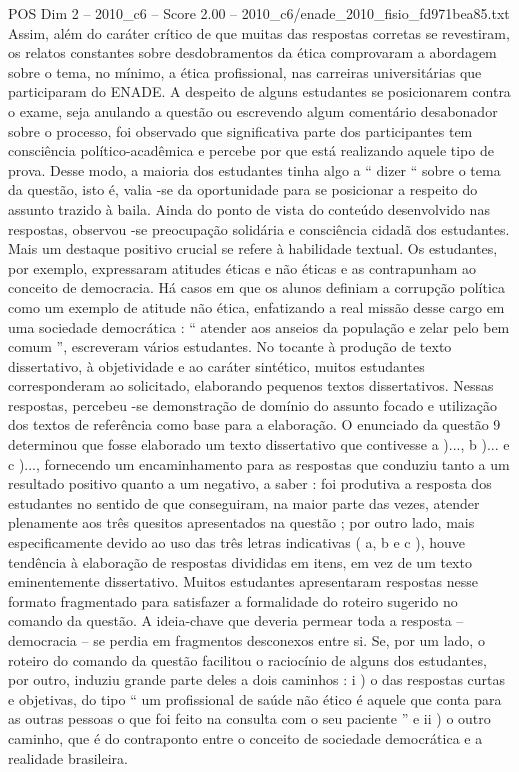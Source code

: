 \begin{textsample}{POS Dim 2 – 2010\_c6 – Score 2.00 – 2010\_c6/enade\_2010\_fisio\_fd971bea85.txt}
Assim, além do caráter crítico de que muitas das respostas corretas se revestiram, os relatos constantes sobre desdobramentos da ética comprovaram a abordagem sobre o tema, no mínimo, a ética profissional, nas carreiras universitárias que participaram do ENADE.
A despeito de alguns estudantes se posicionarem contra o exame, seja anulando a questão ou escrevendo algum comentário desabonador sobre o processo, foi observado que significativa parte dos participantes tem consciência político-acadêmica e percebe por que está realizando aquele tipo de prova.
Desse modo, a maioria dos estudantes tinha algo a “ dizer “ sobre o tema da questão, isto é, valia -se da oportunidade para se posicionar a respeito do assunto trazido à baila.
Ainda do ponto de vista do conteúdo desenvolvido nas respostas, observou -se preocupação solidária e consciência cidadã dos estudantes.
Mais um destaque positivo crucial se refere à habilidade textual.
Os estudantes, por exemplo, expressaram atitudes éticas e não éticas e as contrapunham ao conceito de democracia.
Há casos em que os alunos definiam a corrupção política como um exemplo de atitude não ética, enfatizando a real missão desse cargo em uma sociedade democrática : “ atender aos anseios da população e zelar pelo bem comum ”, escreveram vários estudantes.
No tocante à produção de texto dissertativo, à objetividade e ao caráter sintético, muitos estudantes corresponderam ao solicitado, elaborando pequenos textos dissertativos.
Nessas respostas, percebeu -se demonstração de domínio do assunto focado e utilização dos textos de referência como base para a elaboração.
O enunciado da questão 9 determinou que fosse elaborado um texto dissertativo que contivesse a )..., b )... e c )..., fornecendo um encaminhamento para as respostas que conduziu tanto a um resultado positivo quanto a um negativo, a saber : foi produtiva a resposta dos estudantes no sentido de que conseguiram, na maior parte das vezes, atender plenamente aos três quesitos apresentados na questão ; por outro lado, mais especificamente devido ao uso das três letras indicativas ( a, b e c ), houve tendência à elaboração de respostas divididas em itens, em vez de um texto eminentemente dissertativo.
Muitos estudantes apresentaram respostas nesse formato fragmentado para satisfazer a formalidade do roteiro sugerido no comando da questão.
A ideia-chave que deveria permear toda a resposta – democracia – se perdia em fragmentos desconexos entre si.
Se, por um lado, o roteiro do comando da questão facilitou o raciocínio de alguns dos estudantes, por outro, induziu grande parte deles a dois caminhos : i ) o das respostas curtas e objetivas, do tipo “ um profissional de saúde não ético é aquele que conta para as outras pessoas o que foi feito na consulta com o seu paciente ” e ii ) o outro caminho, que é do contraponto entre o conceito de sociedade democrática e a realidade brasileira.

\end{textsample}
